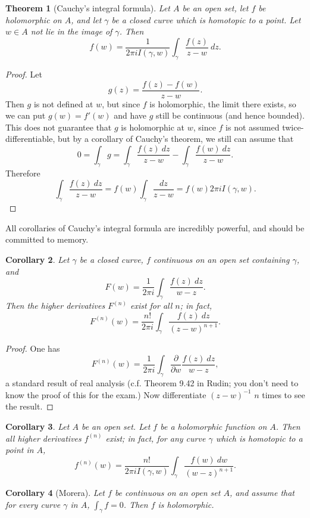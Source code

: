 \documentclass[12pt]{report}
\newtheorem{theorem}{Theorem}[chapter]
\newtheorem{corollary}[theorem]{Corollary}
\theoremstyle{definition}
\theoremstyle{remark}
\begin{document}
\begin{theorem}[Cauchy's integral formula]
Let $A$ be an open set, let $f$ be holomorphic on $A$, and let $\gamma$ be a closed curve which is homotopic to a point. Let $w \in A$ not lie in the image of $\gamma$. Then
$$f(w) = \frac{1}{2\pi iI(\gamma, w)} \int_\gamma \frac{f(z)}{z - w} ~dz.$$
\end{theorem}
\begin{proof}
Let
$$g(z) = \frac{f(z) - f(w)}{z - w}.$$
Then $g$ is not defined at $w$, but since $f$ is holomorphic, the limit there exists, so we can put $g(w) = f'(w)$ and have $g$ still be continuous (and hence bounded). This does not guarantee that $g$ is holomorphic at $w$, since $f$ is not assumed twice-differentiable, but by a corollary of Cauchy's theorem, we still can assume that
$$0 = \int_\gamma g = \int_\gamma \frac{f(z) ~dz}{z - w} - \int_\gamma \frac{f(w) ~dz}{z - w}.$$
Therefore
$$\int_\gamma \frac{f(z) ~dz}{z - w} = f(w) \int_\gamma \frac{dz}{z - w} = f(w) 2\pi i I(\gamma, w).$$
\end{proof}
All corollaries of Cauchy's integral formula are incredibly powerful, and should be committed to memory.
\begin{corollary}
Let $\gamma$ be a closed curve, $f$ continuous on an open set containing $\gamma$, and
$$F(w) = \frac{1}{2\pi i} \int_\gamma \frac{f(z) ~dz}{w - z}.$$
Then the higher derivatives $F^{(n)}$ exist for all $n$; in fact,
$$F^{(n)}(w) = \frac{n!}{2\pi i} \int_\gamma \frac{f(z) ~dz}{(z - w)^{n+1}}.$$	
\end{corollary}
\begin{proof}
One has
$$F^{(n)}(w) = \frac{1}{2\pi i} \int_\gamma \frac{\partial}{\partial w} \frac{f(z) ~dz}{w - z},$$
a standard result of real analysis (c.f. Theorem 9.42 in Rudin; you don't need to know the proof of this for the exam.) Now differentiate $(z - w)^{-1}$ $n$ times to see the result.
\end{proof}
\begin{corollary}
Let $A$ be an open set. Let $f$ be a holomorphic function on $A$. Then all higher derivatives $f^{(n)}$ exist; in fact, for any curve $\gamma$ which is homotopic to a point in $A$,
$$f^{(n)}(w) = \frac{n!}{2\pi i I(\gamma, w)} \int_\gamma \frac{f(w) ~dw}{(w - z)^{n+1}}.$$
\end{corollary}
\begin{corollary}[Morera]
Let $f$ be continuous on an open set $A$, and assume that for every curve $\gamma$ in $A$, $\int_\gamma f = 0$. Then $f$ is holomorphic.
\end{corollary}
\end{document}
